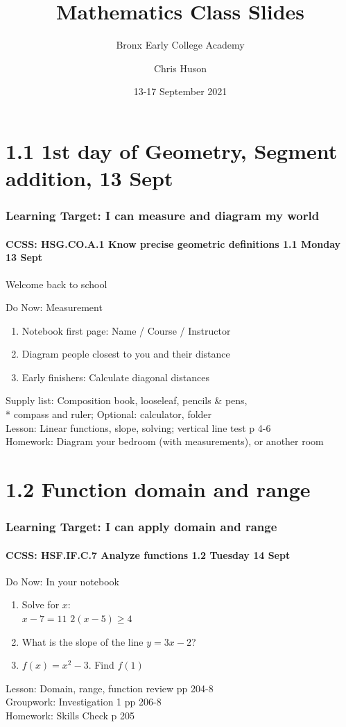 \documentclass{beamer}
\title{Mathematics Class Slides}
\subtitle{Bronx Early College Academy}
\author{Chris Huson}
\date{13-17 September 2021}
\begin{document}
\frame{\titlepage}
\section[Outline]{}
\frame{\tableofcontents}


\section{1.1 1st day of Geometry, Segment addition, 13 Sept}
\frame
{
  \frametitle{Learning Target: I can measure and diagram my world}
  \framesubtitle{CCSS: HSG.CO.A.1 Know precise geometric definitions \hfill \alert{1.1 Monday 13 Sept}}

  Welcome back to school
  \begin{block}{Do Now: Measurement}
  \begin{enumerate}
      \item Notebook first page: Name / Course / Instructor
      \item Diagram people closest to you and their distance
      \item Early finishers: Calculate diagonal distances
  \end{enumerate}
  \end{block}
  Supply list: Composition book, looseleaf, pencils \& pens, \\*
  compass and ruler; Optional: calculator, folder \\[0.25cm]
  Lesson: Linear functions, slope, solving; vertical line test p 4-6 \\[0.25cm]
  Homework: Diagram your bedroom (with measurements), or another room
}


  \section{1.2 Function domain and range}
  \frame
  {
    \frametitle{Learning Target: I can apply domain and range}
    \framesubtitle{CCSS: HSF.IF.C.7 Analyze functions \hfill \alert{1.2 Tuesday 14 Sept}}

    \begin{block}{Do Now: In your notebook}
    \begin{enumerate}
      \item Solve for $x$: \\
      \hspace{1cm} $x-7=11$ \hspace{1cm}  $2(x-5) \geq 4$
      \item What is the slope of the line $y=3x-2$?
      \item $f(x) = x^2 - 3$. Find $f(1)$
    \end{enumerate}
    \end{block}
    Lesson: Domain, range, function review pp 204-8\\[5pt]
    Groupwork: Investigation 1 pp 206-8\\[5pt]
    Homework: Skills Check p 205
  }
\end{document}
